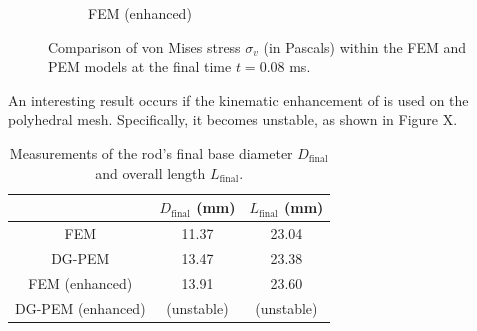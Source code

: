 \begin{figure}[!h]
\begin{subfigure}[b]{0.32\linewidth}
    			\caption{FEM (enhanced) \label{fig:taylor_bar_fem_fbar}}
    \end{subfigure} 
    \caption{Comparison of von Mises stress $\sigma_v$ (in Pascals) within the FEM and PEM models at the final time $t = 0.08$ ms.}
  \label{fig:taylor_bar_stresses}
\end{figure}

An interesting result occurs if the kinematic enhancement of \cite{Rashid:06} is used on the polyhedral mesh. Specifically, it becomes unstable, as shown in Figure X.

\begin{table}[!ht]
  \begin{center}
    \begin{tabular}{| c || c | c |}
    \hline
                & $D_{\text{final}}$ (mm) & $L_{\text{final}}$ (mm) \\ \hline \hline
    FEM               & 11.37 & 23.04 \\ \hline
    DG-PEM            & 13.47 & 23.38 \\ \hline
    FEM (enhanced)    & 13.91 & 23.60 \\ \hline
    DG-PEM (enhanced) & (unstable) & (unstable) \\ \hline
    \hline
    \end{tabular}
    \caption{Measurements of the rod's final base diameter $D_{\text{final}}$ and overall length $L_{\text{final}}$.}
    \vspace{-5pt}
    \label{tab:change_in_length_measurements}
    \vspace{-25pt}
  \end{center}
\end{table}